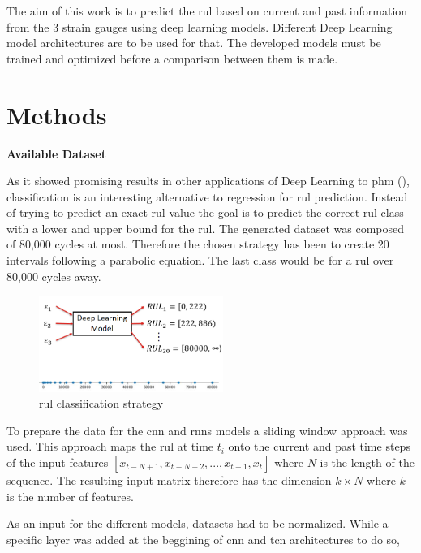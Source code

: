 \documentclass[conference]{IEEEtran}
\begin{document}
The aim of this work is to predict the \gls{rul} based on current and past information from the 3 strain gauges using deep learning models. Different Deep Learning model architectures are to be used for that. The developed models must be trained and optimized before a comparison between them is made.

\section{Methods}
\label{sec:methods}

\noindent
\textbf{Available Dataset}


As it showed promising results in other applications of Deep Learning to \gls{phm} (\cite{Liu2019a, Xiao2016}), classification is an interesting alternative to regression for \gls{rul} prediction. Instead of trying to predict an exact \gls{rul} value the goal is to predict the correct \gls{rul} class with a lower and upper bound for the \gls{rul}. The generated dataset was composed of 80,000 cycles at most. Therefore the chosen strategy has been to create 20 intervals following a parabolic equation. The last class would be for a \gls{rul} over 80,000 cycles away.


\begin{figure}[htp]
	\centering
	\includegraphics[width=6cm]{RUL_Classification.png}
	\caption{\gls{rul} classification strategy}
	\label{fig:RNN-classification}
\end{figure}


To prepare the data for the \gls{cnn} and \glspl{rnn} models a sliding window approach was used. This approach maps the \gls{rul} at time $ t_i $ onto the current and past time steps of the input features $ [x_{t-N+1}, x_{t-N+2},..., x_{t-1}, x_t] $ where $ N $ is the length of the sequence. The resulting input matrix therefore has the dimension $ k \times N $ where $ k $ is the number of features.

As an input for the different models, datasets had to be normalized. While a specific layer was added at the beggining of \gls{cnn} and \gls{tcn} architectures to do so, 
\end{document}
